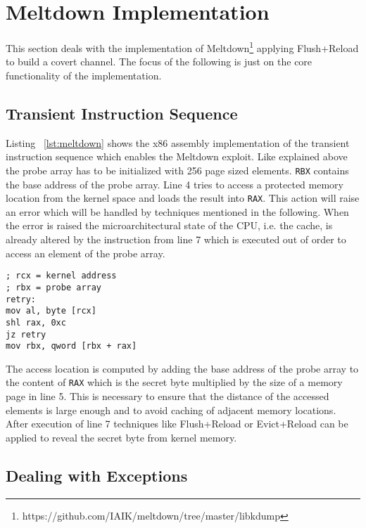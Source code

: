 \documentclass[a4paper,oneside,openright] {scrreprt}
\begin{document}
\section{Meltdown Implementation}
\label{ch:intro:motivation}

This section deals with the implementation of Meltdown\footnote{https://github.com/IAIK/meltdown/tree/master/libkdump} applying
Flush+Reload to build a covert channel. The focus of the following is just on the core functionality of the implementation.

\subsection{Transient Instruction Sequence}
\label{ch:TransientInstructionSequence}

Listing ~\ref{lst:meltdown} shows the x86 assembly implementation of the transient instruction sequence
which enables the Meltdown exploit.
Like explained above the probe array has to be initialized with 256 page sized elements.
\texttt{RBX} contains the base address of the probe array.
Line 4 tries to access a protected memory location from the kernel space and loads the result into \texttt{RAX}. 
This action will raise an error which will be handled by techniques mentioned in the following.
When the error is raised the microarchitectural state of the CPU, i.e. the cache, is already altered 
by the instruction from line 7 which is executed out of order to access an element of the probe array.

\begin{lstlisting}[language={[x86masm]Assembler}, caption=Meltdown: Transient Instruction Sequence, label={lst:meltdown}]
; rcx = kernel address
; rbx = probe array
retry:
mov al, byte [rcx]
shl rax, 0xc
jz retry
mov rbx, qword [rbx + rax]
\end{lstlisting}

The access location is computed by adding the base address of the probe array to the content of \texttt{RAX} which 
is the secret byte multiplied by the size of a memory page in line 5.
This is necessary to ensure that the distance of the accessed elements is large enough and to avoid caching of adjacent memory locations.
After execution of line 7 techniques like Flush+Reload or Evict+Reload can be applied to reveal the secret byte from kernel memory.


\subsection{Dealing with Exceptions}
\label{ch:intro:motivation:A}
\end{document}
